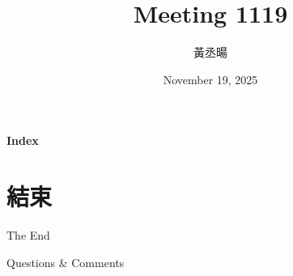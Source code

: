 \documentclass[12pt,aspectratio=43]{beamer}
\title{Meeting 1119}
\author{黃丞暘}
\institute{國立東華大學應數統計所}
\date{November 19, 2025}
\begin{document}
\begin{frame}
  \titlepage
\end{frame}

\begin{frame}{\textbf{Index}}
  \tableofcontents
\end{frame}

\section*{結束}

\begin{frame}[plain] %
	\begin{center}
		{\Huge The End}
		\bigskip\bigskip 

		{\LARGE Questions  \&  Comments}
	\end{center}
\end{frame}
\end{document}
